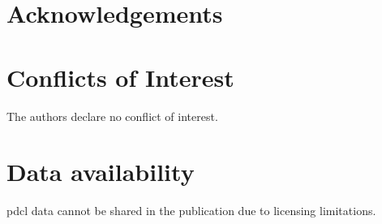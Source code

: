 \section{Acknowledgements}

\section{Conflicts of Interest}
The authors declare no conflict of interest.

\section{Data availability}
\acrshort{pdcl} data cannot be shared in the publication due to licensing limitations. 
